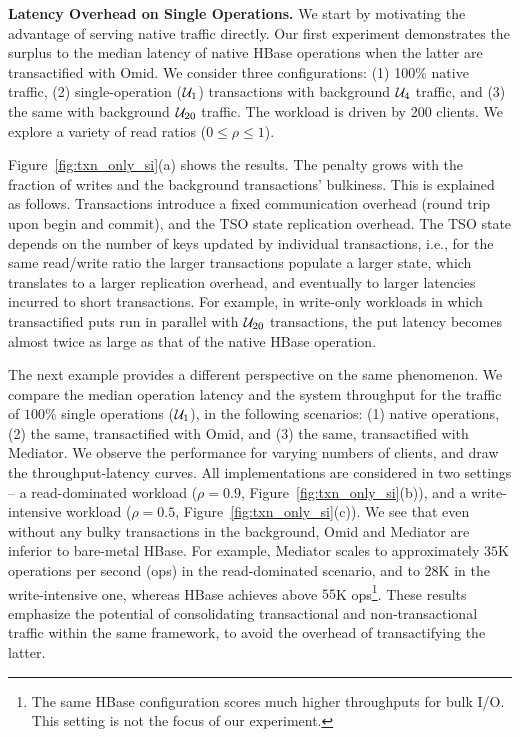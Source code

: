 {\bf Latency Overhead on Single Operations.} 
We start by motivating the advantage of serving native traffic directly. 
Our first experiment demonstrates the surplus to the median latency of native HBase operations 
when the latter are transactified with Omid. We consider three configurations: (1) 100\% native traffic, 
(2) single-operation ($\mathcal{U}_{1}$) transactions with background $\mathcal{U}_{4}$ traffic, and 
(3) the same with background $\mathcal{U}_{20}$ traffic. The workload is driven by 200 clients. 
We explore a variety of read ratios ($0 \leq \rho \leq 1$). 

Figure~\ref{fig:txn_only_si}(a) shows the results. The penalty grows with the fraction of writes
and the background transactions' bulkiness. This is explained as follows. Transactions introduce 
a fixed communication overhead (round trip upon begin and commit), and the TSO state replication 
overhead. The TSO state depends on the number of keys updated by individual transactions, 
i.e., for the same read/write ratio the larger transactions populate a larger state, which translates
to a larger replication overhead, and eventually to larger latencies incurred to short transactions. 
For example, in write-only workloads in which transactified puts run in parallel with $\mathcal{U}_{20}$ 
transactions, the put latency becomes almost twice as large as that of the native HBase operation.   

The next example provides a different perspective on the same phenomenon. We compare the median
operation latency and the system throughput for the traffic of $100\%$ single operations ($\mathcal{U}_{1}$), 
in the following scenarios: (1) native operations, (2) the same, transactified with Omid, and (3) the same, 
transactified with Mediator. We observe the performance for varying numbers of clients, and draw the 
throughput-latency curves. All implementations are considered in two settings -- a read-dominated workload 
($\rho=0.9$, Figure~\ref{fig:txn_only_si}(b)), and a write-intensive workload ($\rho=0.5$, Figure~\ref{fig:txn_only_si}(c)). 
We see that even without any bulky transactions in the background, Omid and Mediator are inferior to
bare-metal HBase. For example, Mediator scales to approximately $35$K operations per second (ops) 
in the read-dominated scenario, and to $28$K in the write-intensive one, whereas HBase achieves above 
$55$K ops\footnote{\footnotesize{The same HBase configuration scores much higher throughputs 
for bulk I/O. This setting is not the focus of our experiment.}}. These results emphasize the potential 
of consolidating transactional and non-transactional traffic within the same framework, 
to avoid the overhead of transactifying the latter.

